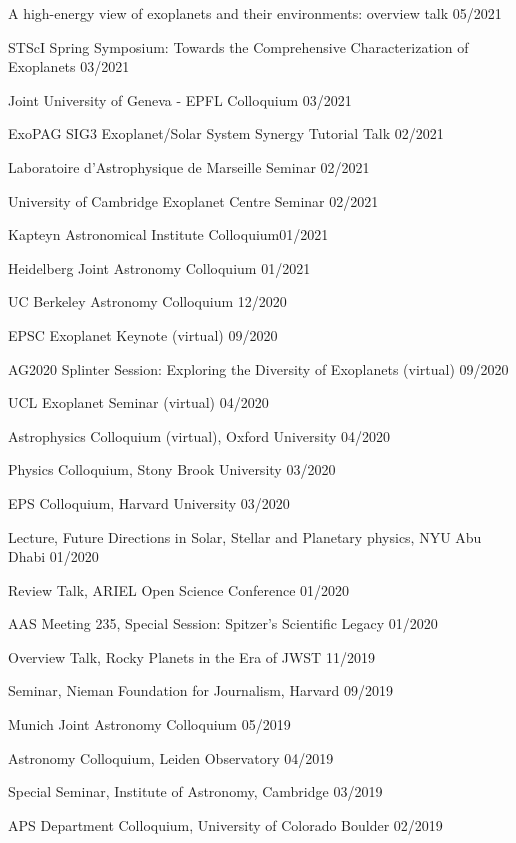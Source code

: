 \documentclass[12pt,letterpaper]{article}
\begin{document}
\begin{list}{}{\cvlist}
\item {A high-energy view of exoplanets and their environments: overview talk \hfill 05/2021}
\item {STScI Spring Symposium: Towards the Comprehensive Characterization of Exoplanets \hfill 03/2021}
\item {Joint University of Geneva - EPFL Colloquium \hfill 03/2021}
\item {ExoPAG SIG3 Exoplanet/Solar System Synergy Tutorial Talk \hfill 02/2021}
\item {Laboratoire d'Astrophysique de Marseille Seminar \hfill 02/2021}
\item {University of Cambridge Exoplanet Centre Seminar \hfill 02/2021}
\item {Kapteyn Astronomical Institute Colloquium\hfill 01/2021}
\item {Heidelberg Joint Astronomy Colloquium \hfill 01/2021}
\item {UC Berkeley Astronomy Colloquium \hfill 12/2020}
\item {EPSC Exoplanet Keynote (virtual) \hfill 09/2020}
\item {AG2020 Splinter Session: Exploring the Diversity of Exoplanets (virtual) \hfill 09/2020}
\item {UCL Exoplanet Seminar (virtual) \hfill 04/2020}
\item {Astrophysics Colloquium (virtual), Oxford University \hfill 04/2020}
\item {Physics Colloquium, Stony Brook University \hfill 03/2020}
\item {EPS Colloquium, Harvard University \hfill 03/2020}
\item {Lecture, Future Directions in Solar, Stellar and Planetary physics, NYU Abu Dhabi \hfill 01/2020}
\item {Review Talk, ARIEL Open Science Conference \hfill 01/2020} 
\item {AAS Meeting 235, Special Session: Spitzer's Scientific Legacy \hfill 01/2020}
\item {Overview Talk, Rocky Planets in the Era of JWST \hfill 11/2019}
\item {Seminar, Nieman Foundation for Journalism, Harvard \hfill 09/2019}
\item {Munich Joint Astronomy Colloquium \hfill 05/2019}
\item {Astronomy Colloquium, Leiden Observatory \hfill 04/2019}
\item {Special Seminar, Institute of Astronomy, Cambridge \hfill 03/2019}
\item {APS Department Colloquium, University of Colorado Boulder \hfill 02/2019}

\end{list}
\end{document}
